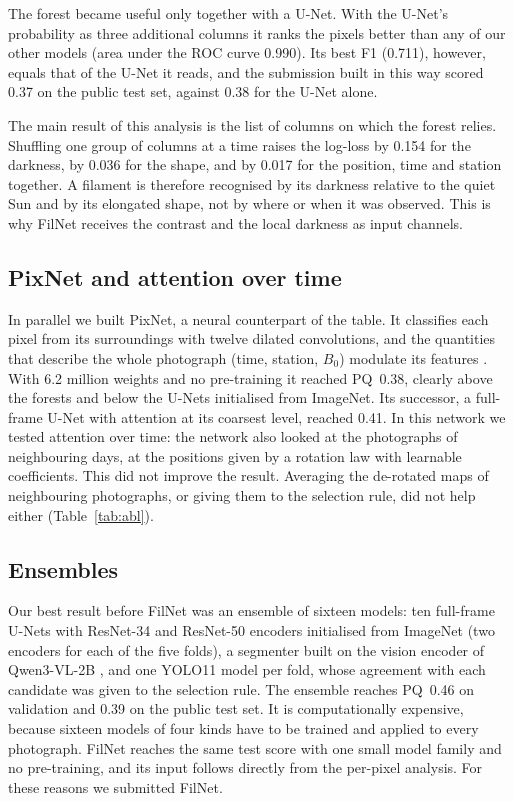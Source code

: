 \documentclass[sigconf]{acmart}
\begin{document}
The forest became useful only together with a U-Net. With the U-Net's probability as three additional columns it ranks the pixels better than any of our other models (area under the ROC curve 0.990). Its best F1 (0.711), however, equals that of the U-Net it reads, and the submission built in this way scored 0.37 on the public test set, against 0.38 for the U-Net alone.

The main result of this analysis is the list of columns on which the forest relies. Shuffling one group of columns at a time raises the log-loss by 0.154 for the darkness, by 0.036 for the shape, and by 0.017 for the position, time and station together. A filament is therefore recognised by its darkness relative to the quiet Sun and by its elongated shape, not by where or when it was observed. This is why FilNet receives the contrast and the local darkness as input channels.

\subsection{PixNet and attention over time}
In parallel we built PixNet, a neural counterpart of the table. It classifies each pixel from its surroundings with twelve dilated convolutions, and the quantities that describe the whole photograph (time, station, $B_0$) modulate its features \cite{perez2018film}. With 6.2 million weights and no pre-training it reached PQ~0.38, clearly above the forests and below the U-Nets initialised from ImageNet. Its successor, a full-frame U-Net with attention at its coarsest level, reached 0.41. In this network we tested attention over time: the network also looked at the photographs of neighbouring days, at the positions given by a rotation law with learnable coefficients. This did not improve the result. Averaging the de-rotated maps of neighbouring photographs, or giving them to the selection rule, did not help either (Table~\ref{tab:abl}).

\subsection{Ensembles}
Our best result before FilNet was an ensemble of sixteen models: ten full-frame U-Nets with ResNet-34 and ResNet-50 encoders initialised from ImageNet (two encoders for each of the five folds), a segmenter built on the vision encoder of Qwen3-VL-2B \cite{qwen3vl2025}, and one YOLO11 model \cite{yolo11} per fold, whose agreement with each candidate was given to the selection rule. The ensemble reaches PQ~0.46 on validation and 0.39 on the public test set. It is computationally expensive, because sixteen models of four kinds have to be trained and applied to every photograph. FilNet reaches the same test score with one small model family and no pre-training, and its input follows directly from the per-pixel analysis. For these reasons we submitted FilNet.
\end{document}
